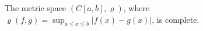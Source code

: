The metric space $(C[a,b], \varrho)$, where $\varrho(f, g) = \sup_{a \leq x \leq b} |f(x) - g(x)|$, is complete.
